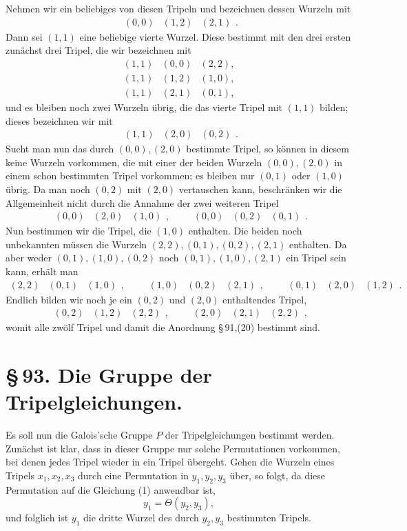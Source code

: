 \documentclass[11pt]{article}
\providecommand{\trip}[3]{\begin{array}{ccc}#1&#2&#3\end{array}}
\providecommand{\trip}[3]{\begin{array}{ccc}#1&#2&#3\end{array}}
\begin{document}
Nehmen wir ein beliebiges von diesen Tripeln und bezeichnen dessen Wurzeln mit
\[
\trip{(0,0)}{(1,2)}{(2,1)}.
\]
Dann sei \((1,1)\) eine beliebige vierte Wurzel. Diese bestimmt mit den drei ersten zunächst drei Tripel, die wir bezeichnen mit
\[
\begin{array}{ccc}
(1,1)&(0,0)&(2,2),\\
(1,1)&(1,2)&(1,0),\\
(1,1)&(2,1)&(0,1),
\end{array}
\]
und es bleiben noch zwei Wurzeln übrig, die das vierte Tripel mit \((1,1)\) bilden; dieses bezeichnen wir mit
\[
\trip{(1,1)}{(2,0)}{(0,2)}.
\]
Sucht man nun das durch \((0,0),(2,0)\) bestimmte Tripel, so können in diesem keine Wurzeln vorkommen, die mit einer der beiden Wurzeln \((0,0),(2,0)\) in einem schon bestimmten Tripel vorkommen; es bleiben nur \((0,1)\) oder \((1,0)\) übrig. Da man noch \((0,2)\) mit \((2,0)\) vertauschen kann, beschränken wir die Allgemeinheit nicht durch die Annahme der zwei weiteren Tripel
\[
\trip{(0,0)}{(2,0)}{(1,0)},
\qquad
\trip{(0,0)}{(0,2)}{(0,1)}.
\]
Nun bestimmen wir die Tripel, die \((1,0)\) enthalten. Die beiden noch unbekannten müssen die Wurzeln \((2,2),(0,1),(0,2),(2,1)\) enthalten. Da aber weder \((0,1),(1,0),(0,2)\) noch \((0,1),(1,0),(2,1)\) ein Tripel sein kann, erhält man
\[
\trip{(2,2)}{(0,1)}{(1,0)},
\qquad
\trip{(1,0)}{(0,2)}{(2,1)},
\qquad
\trip{(0,1)}{(2,0)}{(1,2)}.
\]
Endlich bilden wir noch je ein \((0,2)\) und \((2,0)\) enthaltendes Tripel,
\[
\trip{(0,2)}{(1,2)}{(2,2)},
\qquad
\trip{(2,0)}{(2,1)}{(2,2)},
\]
womit alle zwölf Tripel und damit die Anordnung \S\,91,(20) bestimmt sind.

\section*{\S\,93. Die Gruppe der Tripelgleichungen.}

Es soll nun die Galois'sche Gruppe \(P\) der Tripelgleichungen bestimmt werden. Zunächst ist klar, dass in dieser Gruppe nur solche Permutationen vorkommen, bei denen jedes Tripel wieder in ein Tripel übergeht. Gehen die Wurzeln eines Tripels \(x_1,x_2,x_3\) durch eine Permutation in \(y_1,y_2,y_3\) über, so folgt, da diese Permutation auf die Gleichung (1) anwendbar ist,
\[
 y_1=\Theta(y_2,y_3),
\]
und folglich ist \(y_1\) die dritte Wurzel des durch \(y_2,y_3\) bestimmten Tripels.
\end{document}
